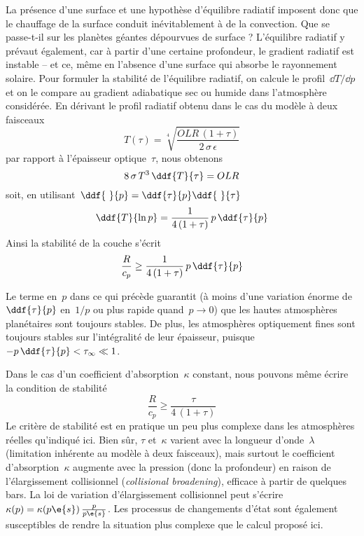 \sk
La présence d'une surface et une hypothèse d'équilibre radiatif imposent donc que le chauffage de la surface conduit inévitablement à de la convection. Que se passe-t-il sur les planètes géantes dépourvues de surface ? L'équilibre radiatif y prévaut également, car à partir d'une certaine profondeur, le gradient radiatif est instable -- et ce, même en l'absence d'une surface qui absorbe le rayonnement solaire. Pour formuler la stabilité de l'équilibre radiatif, on calcule le profil~$\dd T / \dd p$ et on le compare au gradient adiabatique sec ou humide dans l'atmosphère considérée. En dérivant le profil radiatif obtenu dans le cas du modèle à deux faisceaux
\[ T(\tau) = \sqrt[4]{\frac{OLR\,(1+\tau)}{2\,\sigma\,\epsilon}} \]
\noindent par rapport à l'épaisseur optique~$\tau$, nous obtenons
\[ 8 \, \sigma \, T^3 \, \ddf{T}{\tau} = OLR \]
\noindent soit, en utilisant~$\ddf{~}{p} = \ddf{\tau}{p} \ddf{~}{\tau}$
\[ \ddf{T}{\ln p} = \frac{1}{4\,(1+\tau)} \, p \, \ddf{\tau}{p} \]
Ainsi la stabilité de la couche s'écrit
\[ \frac{R}{c_p} \ge \frac{1}{4\,(1+\tau)} \, p \, \ddf{\tau}{p} \]

\sk
Le terme en~$p$ dans ce qui précède guarantit (à moins d'une variation énorme de $\ddf{\tau}{p}$ en~$1/p$ ou plus rapide quand~$p \rightarrow 0$) que les hautes atmosphères planétaires sont toujours stables. De plus, les atmosphères optiquement fines sont toujours stables sur l'intégralité de leur épaisseur, puisque~$-p \, \ddf{\tau}{p} < \tau_\infty \ll 1$. 

\sk
Dans le cas d'un coefficient d'absorption~$\kappa$ constant, nous pouvons même écrire la condition de stabilité
\[ \frac{R}{c_p} \ge \frac{\tau}{4\,(1+\tau)} \]
\noindent Le critère de stabilité est en pratique un peu plus complexe dans les atmosphères réelles qu'indiqué ici. Bien sûr, $\tau$ et~$\kappa$ varient avec la longueur d'onde~$\lambda$ (limitation inhérente au modèle à deux faisceaux), mais surtout le coefficient d'absorption~$\kappa$ augmente avec la pression (donc la profondeur) en raison de l'élargissement collisionnel (\emph{collisional broadening}), efficace à partir de quelques bars. La loi de variation d'élargissement collisionnel peut s'écrire~$\kappa(p) = \kappa(p\e{s}) \, \frac{p}{p\e{s}}$. Les processus de changements d'état sont également susceptibles de rendre la situation plus complexe que le calcul proposé ici.
